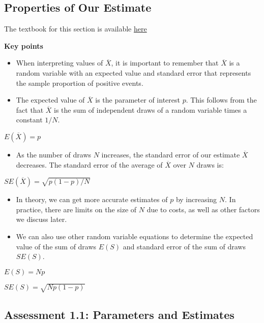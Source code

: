 \documentclass[
]{article}
\providecommand{\tightlist}{%
  \setlength{\itemsep}{0pt}\setlength{\parskip}{0pt}}
\begin{document}
\hypertarget{properties-of-our-estimate}{%
\subsection{Properties of Our
Estimate}\label{properties-of-our-estimate}}

The textbook for this section is available
\href{https://rafalab.github.io/dsbook/inference.html\#properties-of-our-estimate-expected-value-and-standard-error}{here}

\textbf{Key points}

\begin{itemize}
\tightlist
\item
  When interpreting values of \(\overline{X}\), it is important to
  remember that \(\overline{X}\) is a random variable with an expected
  value and standard error that represents the sample proportion of
  positive events.
\item
  The expected value of \(\overline{X}\) is the parameter of interest
  \(p\). This follows from the fact that \(\overline{X}\) is the sum of
  independent draws of a random variable times a constant \(1/N\).
\end{itemize}

\(E(\overline{X}) = p\)

\begin{itemize}
\tightlist
\item
  As the number of draws \(N\) increases, the standard error of our
  estimate \(\overline{X}\) decreases. The standard error of the average
  of \(\overline{X}\) over \(N\) draws is:
\end{itemize}

\(SE(\overline{X}) = \sqrt{p(1-p)/N}\)

\begin{itemize}
\tightlist
\item
  In theory, we can get more accurate estimates of \(p\) by increasing
  \(N\). In practice, there are limits on the size of \(N\) due to
  costs, as well as other factors we discuss later.
\item
  We can also use other random variable equations to determine the
  expected value of the sum of draws \(E(S)\) and standard error of the
  sum of draws \(SE(S)\).
\end{itemize}

\(E(S) = Np\)

\(SE(S) = \sqrt{Np(1-p)}\)

\hypertarget{assessment-1.1-parameters-and-estimates}{%
\subsection{Assessment 1.1: Parameters and
Estimates}\label{assessment-1.1-parameters-and-estimates}}
\end{document}
